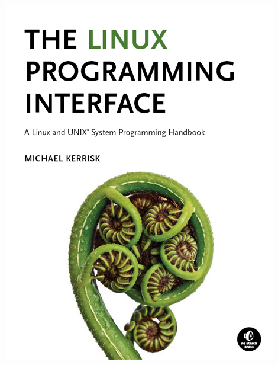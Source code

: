 \begin{frame}
\begin{columns}
\begin{center}
      \includegraphics[height=0.4\textheight]{slides/kernel-resources-references/linux-programming-interface.png}
    \end{center}
  \end{columns}
\end{frame}

